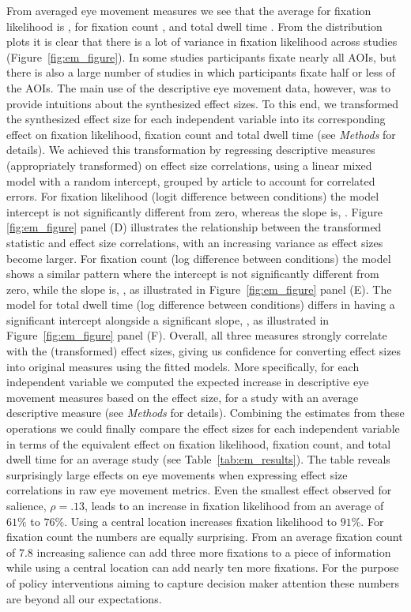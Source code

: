 From averaged eye movement measures we see that the average for fixation likelihood is \unskip, for fixation count \unskip, and total dwell time \unskip. From the distribution plots it is clear that there is a lot of variance in fixation likelihood across studies (Figure~\ref{fig:em_figure}). In some studies participants fixate nearly all AOIs, but there is also a large number of studies in which participants fixate half or less of the AOIs. The main use of the descriptive eye movement data, however, was to provide intuitions about the synthesized effect sizes. To this end, we transformed the synthesized effect size for each independent variable into its corresponding effect on fixation likelihood, fixation count and total dwell time (see \textit{Methods} for details). We achieved this transformation by regressing descriptive measures (appropriately transformed) on effect size correlations, using a linear mixed model with a random intercept, grouped by article to account for correlated errors. For fixation likelihood (logit difference between conditions) the model intercept is not significantly different from zero, whereas the slope is, \unskip. Figure \ref{fig:em_figure} panel (D) illustrates the relationship between the transformed statistic and effect size correlations, with an increasing variance as effect sizes become larger. For fixation count (log difference between conditions) the model shows a similar pattern where the intercept is not significantly different from zero, while the slope is, \unskip, as illustrated in Figure~\ref{fig:em_figure} panel (E). The model for total dwell time (log difference between conditions) differs in having a significant intercept alongside a significant slope, \unskip, as illustrated in Figure~\ref{fig:em_figure} panel (F). Overall, all three measures strongly correlate with the (transformed) effect sizes, giving us confidence for converting effect sizes into original measures using the fitted models. More specifically, for each independent variable we computed the expected increase in descriptive eye movement measures based on the effect size, for a study with an average descriptive measure (see \textit{Methods} for details). Combining the estimates from these operations we could finally compare the effect sizes for each independent variable in terms of the equivalent effect on fixation likelihood, fixation count, and total dwell time for an average study (see Table~\ref{tab:em_results}). The table reveals surprisingly large effects on eye movements when expressing effect size correlations in raw eye movement metrics. Even the smallest effect observed for salience, $\rho = .13$, leads to an increase in fixation likelihood from an average of $61\%$ to $76\%$. Using a central location increases fixation likelihood to $91\%$. For fixation count the numbers are equally surprising. From an average fixation count of $7.8$ increasing salience can add three more fixations to a piece of information while using a central location can add nearly ten more fixations. For the purpose of policy interventions aiming to capture decision maker attention these numbers are beyond all our expectations.


